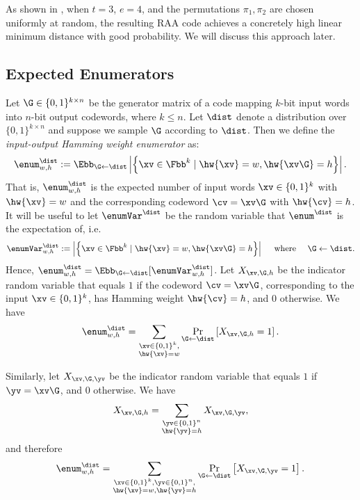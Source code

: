 \noindent As shown in \cite{spielman}, when $t=3$, $e=4$, and the permutations $\pi_1,\pi_2$ are chosen uniformly at random, the resulting RAA code achieves a concretely high linear minimum distance with good probability. %
We will discuss this approach later.


\subsection{Expected Enumerators}\label{sec:eenum}

Let $\G \in \{0,1\}^{k \times n}$ be the generator matrix of a code mapping $k$-bit input words into $n$-bit output codewords, where $k \le n$. Let $\dist$ denote a distribution over $\{0,1\}^{k \times n}$ and suppose we sample $\G$ according to $\dist$. Then we define the \emph{input-output Hamming weight enumerator}  as:
$$
    \enum^{\dist}_{w,h}:= \Ebb_{\G\gets\dist} \left|\left\{ \xv \in \Fbb^{k} \mid \hw{\xv}=w,\hw{\xv\G}=h \right\} \right|.
$$ 
That is, $\enum^{\dist}_{w,h}$ is the expected number of input words $\xv \in \{0,1\}^k$ with $\hw{\xv} = w$ and the corresponding codeword $\cv = \xv\G$ with $\hw{\cv} = h$. It will be useful to let $\enumVar^\dist$ be the random variable that $\enum^{\dist}$ is the expectation  of, i.e.  
$$
    \enumVar^{\dist}_{w,h}:= \left|\left\{ \xv \in \Fbb^{k} \mid \hw{\xv}=w,\hw{\xv\G}=h \right\} \right| \quad\text{ where } \quad  \G\gets\dist.
$$ 
Hence, $\enum^\dist_{w,h}=\Ebb_{\G\gets\dist}[\enumVar^\dist_{w,h}]$.
Let $X_{\xv, \G, h}$ be the indicator random variable that equals $1$ if the codeword $\cv = \xv\G$, corresponding to the input $\xv \in \{0,1\}^k$, has Hamming weight $\hw{\cv} = h$, and $0$ otherwise.
We have
$$
    \enum^\dist_{w,h}=\sum_{\substack{\xv \in \{0,1\}^k,\\\hw{\xv} = w}}\Pr_{\G \gets \dist}\left[X_{\xv, \G, h}=1\right].
$$

Similarly, let $X_{\xv, \G, \yv}$ be the indicator random variable that equals $1$ if $\yv = \xv\G$, and $0$ otherwise. We have
$$
    X_{\xv, \G, h} = \sum_{\substack{\yv \in \{0,1\}^n\\\hw{\yv} = h}}X_{\xv, \G, \yv},
$$
and therefore
$$
    \enum^\dist_{w,h}=\sum_{\substack{\xv\in \{0,1\}^k, \yv \in \{0,1\}^n,\\\hw{\xv} = w,\hw{\yv} = h}}\Pr_{\G \gets \dist}\left[X_{\xv, \G, \yv}=1\right].
$$

